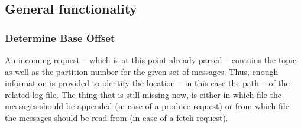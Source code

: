 \begin{table}[H]
\end{table}

\subsection{General functionality}

\subsubsection{Determine Base Offset}
\label{subsubsec:broker-log-general-baseoffset}

An incoming request -- which is at this point already parsed -- contains the
topic as well as the partition number for the given set of messages. Thus,
enough information is provided to identify the location -- in this case the path
-- of the related log file.  The thing that is still missing now, is either in
which file the messages should be appended (in case of a produce request) or
from which file the messages should be read from (in case of a fetch request).

